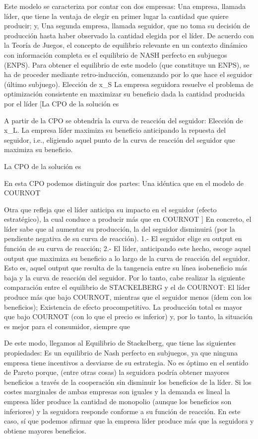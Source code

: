 \documentclass[10pt,a4paper]{article}
\begin{document}
Este modelo se caracteriza por contar con dos empresas:
	Una empresa, llamada líder, que tiene la ventaja de elegir en primer lugar la cantidad que quiere producir;  y,
	Una segunda empresa, llamada seguidor, que no toma su decisión de producción hasta haber observado la cantidad elegida por el líder. 
De acuerdo con la Teoría de Juegos, el concepto de equilibrio relevante en un contexto dinámico con información completa es el equilibrio de NASH perfecto en subjuegos (ENPS). Para obtener el equilibrio de este modelo (que constituye un ENPS), se ha de proceder mediante retro-inducción, comenzando por lo que hace el seguidor (último subjuego). 
	Elección de x_S
La empresa seguidora resuelve el problema de optimización consistente en maximizar su beneficio dada la cantidad producida por el líder
 [La CPO de la solución es
 
A partir de la CPO se obtendría la curva de reacción del seguidor:
	Elección de x_L. 
La empresa líder maximiza su beneficio anticipando la repuesta del seguidor, i.e., eligiendo aquel punto de la curva de reacción del seguidor que maximiza su beneficio.
 
La CPO de la solución es
 
En esta CPO podemos distinguir dos partes:
	Una idéntica que en el modelo de COURNOT
 
	Otra que refleja que el líder anticipa su impacto en el seguidor (efecto estratégico), la cual conduce a producir más que en COURNOT 
 ]
En concreto, el líder sabe que al aumentar su producción, la del seguidor disminuirá (por la pendiente negativa de su curva de reacción). 
1.- El seguidor elige su output en función de su curva de reacción; 
2.- El líder, anticipando este hecho, escoge aquel output que maximiza su beneficio a lo largo de la curva de reacción del seguidor. Esto es, aquel output que resulta de la tangencia entre su línea isobeneficio más baja y la curva de reacción del seguidor.   
Por lo tanto, cabe realizar la siguiente comparación entre el equilibrio de STACKELBERG y el de COURNOT: 
	El líder produce más que bajo COURNOT, mientras que el seguidor menos (ídem con los beneficios); 
	Existencia de efecto procompetitivo. La producción total es mayor que bajo COURNOT (con lo que el precio es inferior) y, por lo tanto, la situación es mejor para el consumidor, siempre que
 
De este modo, llegamos al Equilibrio de Stackelberg, que tiene las siguientes propiedades:
	Es un equilibrio de Nash perfecto en subjuegos, ya que ninguna empresa tiene incentivos a desviarse de su estrategia.
	No es óptimo en el sentido de Pareto porque, (entre otras cosas) la seguidora podría obtener mayores beneficios a través de la cooperación sin disminuir los beneficios de la líder.
	Si los costes marginales de ambas empresas son iguales y la demanda es lineal la empresa líder produce la cantidad de monopolio (aunque los beneficios son inferiores) y la seguidora responde conforme a su función de reacción. En este caso, sí que podemos afirmar que la empresa líder produce más que la seguidora y obtiene mayores beneficios.
\end{document}
